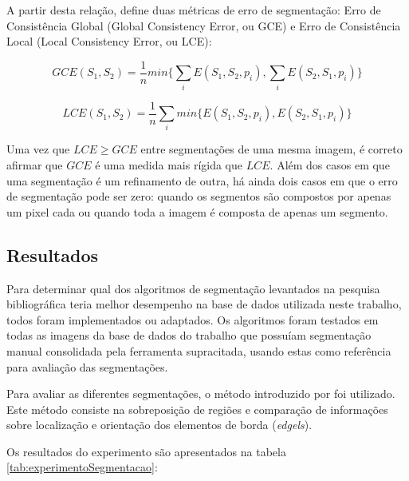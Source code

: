 A partir desta relação,  define duas métricas de erro de segmentação: Erro de Consistência Global (Global Consistency Error, ou GCE) e Erro de Consistência Local (Local Consistency Error, ou LCE):

\begin{equation}
	GCE(S_1,S_2) = \frac{1}{n} min \biggl\{ \sum_{i} E(S_1,S_2,p_i), \sum_{i} E(S_2,S_1,p_i) \biggr\}
\end{equation}

\begin{equation}
	LCE(S_1,S_2) = \frac{1}{n} \sum_{i} min \biggl\{ E(S_1,S_2,p_i), E(S_2,S_1,p_i) \biggr\}
\end{equation}

Uma vez que $LCE \geq GCE$ entre segmentações de uma mesma imagem, é correto afirmar que $GCE$ é uma medida mais rígida que $LCE$. Além dos casos em que uma segmentação é um refinamento de outra, há ainda dois casos em que o erro de segmentação pode ser zero: quando os segmentos são compostos por apenas um pixel cada ou quando toda a imagem é composta de apenas um segmento.

\subsection{Resultados}



Para determinar qual dos algoritmos de segmentação levantados na pesquisa bibliográfica teria melhor desempenho na base de dados utilizada neste trabalho, todos foram implementados ou adaptados. Os algoritmos foram testados em todas as imagens da base de dados do trabalho que possuíam segmentação manual consolidada pela ferramenta supracitada, usando estas como referência para avaliação das segmentações.

Para avaliar as diferentes segmentações, o método introduzido por  foi utilizado. Este método consiste na sobreposição de regiões e comparação de informações sobre localização e orientação dos elementos de borda (\textit{edgels}).

Os resultados do experimento são apresentados na tabela \ref{tab:experimentoSegmentacao}:

